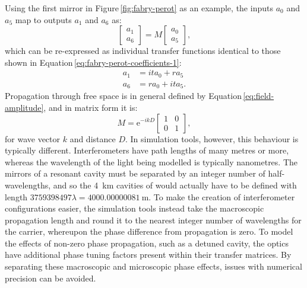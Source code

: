 Using the first mirror in Figure\,\ref{fig:fabry-perot} as an example, the inputs $a_0$ and $a_5$ map to outputs $a_1$ and $a_6$ as:
\begin{equation}
  \begin{bmatrix}
    a_1 \\
    a_6
  \end{bmatrix}
  =
  M
  \begin{bmatrix}
    a_0 \\
    a_5
  \end{bmatrix}
  ,
\end{equation}
which can be re-expressed as individual transfer functions identical to those shown in Equation\,\ref{eq:fabry-perot-coefficients-1}:
\begin{align}
  a_1 &= it a_0 + r a_5 \\
  a_6 &= r a_0 + it a_5.
\end{align}
Propagation through free space is in general defined by Equation\,\ref{eq:field-amplitude}, and in matrix form it is:
\begin{equation}
  M = \text{e}^{-ikD}
  \begin{bmatrix}
    1 & 0 \\
    0 & 1
  \end{bmatrix}
  ,
\end{equation}
for wave vector $k$ and distance $D$. In simulation tools, however, this behaviour is typically different. Interferometers have path lengths of many metres or more, whereas the wavelength of the light being modelled is typically nanometres. The mirrors of a resonant cavity must be separated by an integer number of half-wavelengths, and so the \SI{4}{\kilo\meter} \FP{} cavities of \ALIGO{} would actually have to be defined with length $\num{3759398497}\lambda = \SI{4000.00000081}{\meter}$. To make the creation of interferometer configurations easier, the simulation tools instead take the macroscopic propagation length and round it to the nearest integer number of wavelengths for the carrier, whereupon the phase difference from propagation is zero. To model the effects of non-zero phase propagation, such as a detuned cavity, the optics have additional phase tuning factors present within their transfer matrices. By separating these macroscopic and microscopic phase effects, issues with numerical precision can be avoided.

